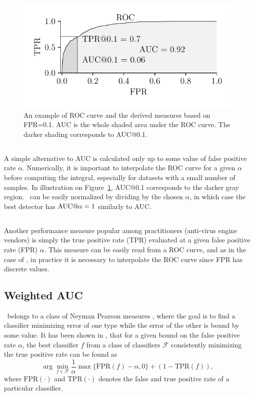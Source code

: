 \begin{figure}
\centering
\includegraphics[scale=0.85]{data/chapter_intro/fig_roc.pdf}
\caption{An example of ROC curve and the derived measures based on FPR=0.1. AUC is the whole shaded area under the ROC curve. The darker shading corresponds to AUC@0.1.}
\label{fig:ROC}
\end{figure}

\subsection{\auca}
A simple alternative to AUC is calculated only up to some value of false positive rate $\alpha$. Numerically, it is important to interpolate the ROC curve for a given $\alpha$ before computing the integral, especially for datasets with a small number of samples. In illustration on Figure~\ref{fig:ROC}, AUC@0.1 corresponds to the darker gray region. \auca\ can be easily normalized by dividing by the chosen $\alpha$, in which case the best detector has $\textrm{AUC@}\alpha = 1$ similarly to AUC.

\subsection{\tpra}
Another performance measure popular among practitioners (anti-virus engine vendors) is simply the true positive rate (TPR) evaluated at a given false positive rate (FPR) $\alpha.$ This measure can be easily read from a ROC curve, and as in the case of \auca, in practice it is necessary to interpolate the ROC curve since FPR has discrete values.

\subsection{Weighted AUC}
\tpra~belongs to a class of Neyman Pearson measures \cite{scott2007performance}, where the goal is to find a classifier minimizing error of one type while the error of the other is bound by some value. It has been shown in \cite{scott2007performance}, that for a given bound on the false positive rate $\alpha$, the best classifier $f$ from a class of classifiers $\mathcal{F}$ consistently minimizing the true positive rate can be found as
\begin{equation}
\arg \min_{f\in\mathcal{F}} \frac{1}{\alpha} \max\{\text{FPR}(f) - \alpha, 0\} + (1 - \text{TPR}(f)),
\end{equation}   
where $\text{FPR}(\cdot)$ and $\text{TPR}(\cdot)$ denotes the false and true positive rate of a particular classifier.

